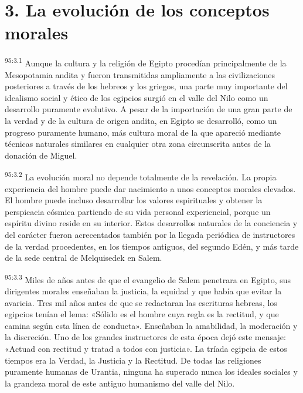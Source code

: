 \section*{3. La evolución de los conceptos morales}
\par
\textsuperscript{95:3.1} Aunque la cultura y la religión de Egipto procedían principalmente de la Mesopotamia andita y fueron transmitidas ampliamente a las civilizaciones posteriores a través de los hebreos y los griegos, una parte muy importante del idealismo social y ético de los egipcios surgió en el valle del Nilo como un desarrollo puramente evolutivo. A pesar de la importación de una gran parte de la verdad y de la cultura de origen andita, en Egipto se desarrolló, como un progreso puramente humano, más cultura moral de la que apareció mediante técnicas naturales similares en cualquier otra zona circunscrita antes de la donación de Miguel.

\par
\textsuperscript{95:3.2} La evolución moral no depende totalmente de la revelación. La propia experiencia del hombre puede dar nacimiento a unos conceptos morales elevados. El hombre puede incluso desarrollar los valores espirituales y obtener la perspicacia cósmica partiendo de su vida personal experiencial, porque un espíritu divino reside en su interior. Estos desarrollos naturales de la conciencia y del carácter fueron acrecentados también por la llegada periódica de instructores de la verdad procedentes, en los tiempos antiguos, del segundo Edén, y más tarde de la sede central de Melquisedek en Salem.

\par
\textsuperscript{95:3.3} Miles de años antes de que el evangelio de Salem penetrara en Egipto, sus dirigentes morales enseñaban la justicia, la equidad y que había que evitar la avaricia. Tres mil años antes de que se redactaran las escrituras hebreas, los egipcios tenían el lema: «Sólido es el hombre cuya regla es la rectitud, y que camina según esta línea de conducta». Enseñaban la amabilidad, la moderación y la discreción. Uno de los grandes instructores de esta época dejó este mensaje: «Actuad con rectitud y tratad a todos con justicia». La tríada egipcia de estos tiempos era la Verdad, la Justicia y la Rectitud. De todas las religiones puramente humanas de Urantia, ninguna ha superado nunca los ideales sociales y la grandeza moral de este antiguo humanismo del valle del Nilo.

